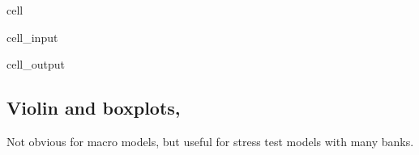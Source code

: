 \documentclass[letterpaper,10pt,english]{jupyterBook}
\begin{document}
\begin{sphinxuseclass}{cell}\begin{sphinxVerbatimInput}

\begin{sphinxuseclass}{cell_input}
\begin{sphinxVerbatim}[commandchars=\\\{\}]
 
      \PYG{p}{[}\PYG{p}{]}  
\end{sphinxVerbatim}

\end{sphinxuseclass}\end{sphinxVerbatimInput}
\begin{sphinxVerbatimOutput}

\begin{sphinxuseclass}{cell_output}
\noindent{}

\end{sphinxuseclass}\end{sphinxVerbatimOutput}

\end{sphinxuseclass}
\sphinxAtStartPar



\subsection{Violin and boxplots,}
\label{\detokenize{content/Python/modelflow_features:violin-and-boxplots}}
\sphinxAtStartPar
Not obvious for macro models, but useful for stress test  models with many banks.
\end{document}
